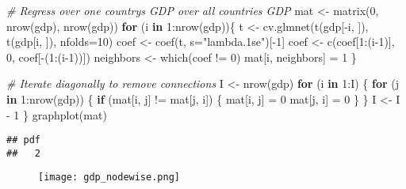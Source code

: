 \documentclass[
]{article}
\newenvironment{Shaded}{\begin{snugshade}}{\end{snugshade}}
\newcommand{\AttributeTok}[1]{\textcolor[rgb]{0.77,0.63,0.00}{#1}}
\newcommand{\CommentTok}[1]{\textcolor[rgb]{0.56,0.35,0.01}{\textit{#1}}}
\newcommand{\ControlFlowTok}[1]{\textcolor[rgb]{0.13,0.29,0.53}{\textbf{#1}}}
\newcommand{\DecValTok}[1]{\textcolor[rgb]{0.00,0.00,0.81}{#1}}
\newcommand{\FunctionTok}[1]{\textcolor[rgb]{0.00,0.00,0.00}{#1}}
\newcommand{\NormalTok}[1]{#1}
\newcommand{\OtherTok}[1]{\textcolor[rgb]{0.56,0.35,0.01}{#1}}
\newcommand{\SpecialCharTok}[1]{\textcolor[rgb]{0.00,0.00,0.00}{#1}}
\newcommand{\StringTok}[1]{\textcolor[rgb]{0.31,0.60,0.02}{#1}}
\begin{document}
\begin{Shaded}
\begin{Highlighting}[]
\CommentTok{\# Regress over one country\textquotesingle{}s GDP over all countries\textquotesingle{} GDP}
\NormalTok{mat }\OtherTok{\textless{}{-}} \FunctionTok{matrix}\NormalTok{(}\DecValTok{0}\NormalTok{, }\FunctionTok{nrow}\NormalTok{(gdp), }\FunctionTok{nrow}\NormalTok{(gdp))}
\ControlFlowTok{for}\NormalTok{ (i }\ControlFlowTok{in} \DecValTok{1}\SpecialCharTok{:}\FunctionTok{nrow}\NormalTok{(gdp))\{}
\NormalTok{  t }\OtherTok{\textless{}{-}} \FunctionTok{cv.glmnet}\NormalTok{(}\FunctionTok{t}\NormalTok{(gdp[}\SpecialCharTok{{-}}\NormalTok{i, ]), }\FunctionTok{t}\NormalTok{(gdp[i, ]), }\AttributeTok{nfolds=}\DecValTok{10}\NormalTok{)}
\NormalTok{  coef }\OtherTok{\textless{}{-}} \FunctionTok{coef}\NormalTok{(t, }\AttributeTok{s=}\StringTok{"lambda.1se"}\NormalTok{)[}\SpecialCharTok{{-}}\DecValTok{1}\NormalTok{]}
\NormalTok{  coef }\OtherTok{\textless{}{-}} \FunctionTok{c}\NormalTok{(coef[}\DecValTok{1}\SpecialCharTok{:}\NormalTok{(i}\DecValTok{{-}1}\NormalTok{)], }\DecValTok{0}\NormalTok{, coef[}\SpecialCharTok{{-}}\NormalTok{(}\DecValTok{1}\SpecialCharTok{:}\NormalTok{(i}\DecValTok{{-}1}\NormalTok{))])}
\NormalTok{  neighbors }\OtherTok{\textless{}{-}} \FunctionTok{which}\NormalTok{(coef }\SpecialCharTok{!=} \DecValTok{0}\NormalTok{)}
\NormalTok{  mat[i, neighbors] }\OtherTok{=} \DecValTok{1}
\NormalTok{\}}

\CommentTok{\# Iterate diagonally to remove connections}
\NormalTok{I }\OtherTok{\textless{}{-}} \FunctionTok{nrow}\NormalTok{(gdp)}
\ControlFlowTok{for}\NormalTok{ (i }\ControlFlowTok{in} \DecValTok{1}\SpecialCharTok{:}\NormalTok{I) \{}
  \ControlFlowTok{for}\NormalTok{ (j }\ControlFlowTok{in} \DecValTok{1}\SpecialCharTok{:}\FunctionTok{nrow}\NormalTok{(gdp)) \{}
    \ControlFlowTok{if}\NormalTok{ (mat[i, j] }\SpecialCharTok{!=}\NormalTok{ mat[j, i]) \{}
\NormalTok{      mat[i, j] }\OtherTok{=} \DecValTok{0}
\NormalTok{      mat[j, i] }\OtherTok{=} \DecValTok{0}
\NormalTok{    \}}
\NormalTok{  \}}
\NormalTok{  I }\OtherTok{\textless{}{-}}\NormalTok{ I }\SpecialCharTok{{-}} \DecValTok{1}
\NormalTok{\}}
\FunctionTok{graphplot}\NormalTok{(mat)}
\end{Highlighting}
\end{Shaded}

\begin{verbatim}
## pdf 
##   2
\end{verbatim}

\begin{figure}
  \texttt{[image: gdp\_nodewise.png]}
\end{figure}
\end{document}
